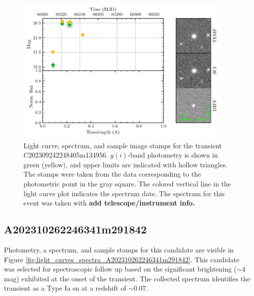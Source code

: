 \documentclass[twocolumn]{aastex631}
\newcommand{\todo}[1]{\textbf{\color{red} #1}}
\begin{document}
\begin{figure}
    \centering
    \includegraphics[width=0.95\textwidth]{figures/light_curves_spectra_7_C202309242248405m134956.pdf}
    \caption{
        Light curve, spectrum, and sample image stamps for the transient C202309242248405m134956.
        $g(i)$-band photometry is shown in green (yellow), and upper limits are indicated with hollow triangles.
        The stamps were taken from the data corresponding to the photometric point in the gray square.
        The colored vertical line in the light curve plot indicates the spectrum date.
        The spectrum for this event was taken with \todo{add telescope/instrument info.}
    }
    \label{fig:light_curves_spectra_C202309242248405m134956}
\end{figure}

\subsection{A202310262246341m291842}

Photometry, a spectrum, and sample stamps for this candidate are visible in Figure \ref{fig:light_curves_spectra_A202310262246341m291842}.
This candidate was selected for spectroscopic follow up based on the significant brightening ($\sim$4 mag) exhibited at the onset of the transient.
The collected spectrum identifies the transient as a Type Ia \gls{sn} at a redshift of $\sim0.07$.
\end{document}
